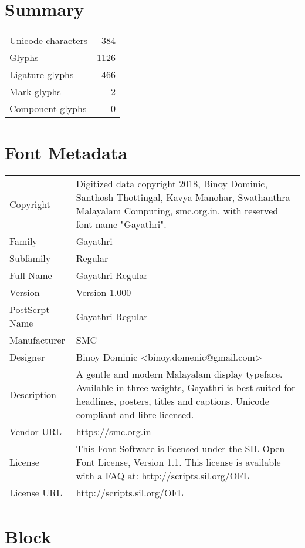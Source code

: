 \section{Summary}

\begin{tabular}[l]{|l|r|}
\hline
Unicode characters & 384 \\
Glyphs & 1126 \\
Ligature glyphs & 466 \\
Mark glyphs & 2 \\
Component glyphs & 0 \\\hline\end{tabular}
\section{Font Metadata}
\begin{longtable}[l]{|l|l|}
    \hline
    \endhead
    \hline
    \endfoot
  Copyright & Digitized data copyright 2018, Binoy Dominic, Santhosh Thottingal, Kavya Manohar, Swathanthra Malayalam Computing, smc.org.in, with reserved font name "Gayathri". \\
Family & Gayathri \\
Subfamily & Regular \\
Full Name & Gayathri Regular \\
Version & Version 1.000 \\
PostScrpt Name & Gayathri-Regular \\
Manufacturer & SMC \\
Designer & Binoy Dominic <binoy.domenic@gmail.com> \\
Description & A gentle and modern Malayalam display typeface. Available in three weights, Gayathri is best suited for headlines, posters, titles and captions. Unicode compliant and libre licensed. \\
Vendor URL & https://smc.org.in \\
License & This Font Software is licensed under the SIL Open Font License, Version 1.1. This license is available with a FAQ at: http://scripts.sil.org/OFL \\
License URL & http://scripts.sil.org/OFL \\
\end{longtable}
\section{Block}

    \newcommand\cell[2]{\begin{tabular}[c]{@{}c@{}}
      \customfont{\symbol{#1}}\\ \tiny{#2}\end{tabular}}
  
